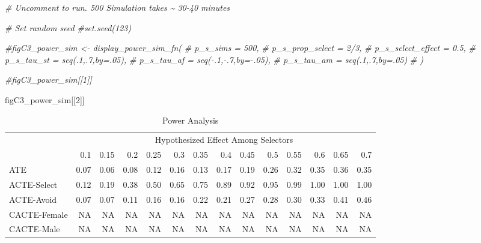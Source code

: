 \documentclass[
]{article}
\newenvironment{Shaded}{\begin{snugshade}}{\end{snugshade}}
\newcommand{\CommentTok}[1]{\textcolor[rgb]{0.56,0.35,0.01}{\textit{#1}}}
\newcommand{\DecValTok}[1]{\textcolor[rgb]{0.00,0.00,0.81}{#1}}
\newcommand{\NormalTok}[1]{#1}
\begin{document}
\begin{Shaded}
\begin{Highlighting}[]
\CommentTok{\# Uncomment to run. 500 Simulation takes \textasciitilde{} 30{-}40 minutes}

\CommentTok{\# Set random seed}
\CommentTok{\#set.seed(123)}

\CommentTok{\#figC3\_power\_sim \textless{}{-} display\_power\_sim\_fn(}
\CommentTok{\#                      p\_s\_sims = 500,}
\CommentTok{\#                       p\_s\_prop\_select = 2/3,}
\CommentTok{\#                       p\_s\_select\_effect = 0.5,}
\CommentTok{\#                       p\_s\_tau\_st = seq(.1,.7,by=.05),}
\CommentTok{\#                       p\_s\_tau\_af = seq({-}.1,{-}.7,by={-}.05),}
\CommentTok{\#                       p\_s\_tau\_am = seq(.1,.7,by=.05)}
\CommentTok{\#                       )}

\CommentTok{\#figC3\_power\_sim[[1]]}
\end{Highlighting}
\end{Shaded}

\begin{Shaded}
\begin{Highlighting}[]
\NormalTok{figC3\_power\_sim[[}\DecValTok{2}\NormalTok{]]}
\end{Highlighting}
\end{Shaded}

\begin{table}[!h]

\caption{\label{tab:figpower3}Power Analysis}
\centering
\begin{tabular}[t]{lrrrrrrrrrrrrr}
\toprule
\multicolumn{1}{c}{} & \multicolumn{13}{c}{Hypothesized Effect Among Selectors} \\
\cmidrule(l{3pt}r{3pt}){2-14}
  & 0.1 & 0.15 & 0.2 & 0.25 & 0.3 & 0.35 & 0.4 & 0.45 & 0.5 & 0.55 & 0.6 & 0.65 & 0.7\\
\midrule
ATE & 0.07 & 0.06 & 0.08 & 0.12 & 0.16 & 0.13 & 0.17 & 0.19 & 0.26 & 0.32 & 0.35 & 0.36 & 0.35\\
ACTE-Select & 0.12 & 0.19 & 0.38 & 0.50 & 0.65 & 0.75 & 0.89 & 0.92 & 0.95 & 0.99 & 1.00 & 1.00 & 1.00\\
ACTE-Avoid & 0.07 & 0.07 & 0.11 & 0.16 & 0.16 & 0.22 & 0.21 & 0.27 & 0.28 & 0.30 & 0.33 & 0.41 & 0.46\\
CACTE-Female & NA & NA & NA & NA & NA & NA & NA & NA & NA & NA & NA & NA & NA\\
CACTE-Male & NA & NA & NA & NA & NA & NA & NA & NA & NA & NA & NA & NA & NA\\
\bottomrule
\end{tabular}
\end{table}
\end{document}
